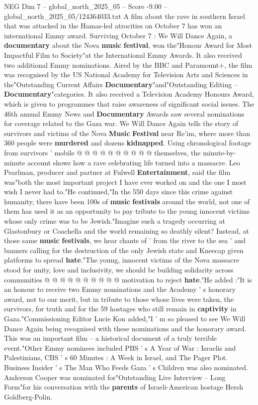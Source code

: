 \begin{textsample}{NEG Dim 7 – global\_north\_2025\_05 – Score -9.00 – global\_north\_2025\_05/124364033.txt}  \label{ex:f7_neg_103}
A film about the rave in southern Israel that was attacked in the Hamas-led atrocities on October 7 has won an international Emmy award.
Surviving October 7 : We Will Dance Again, a \textbf{documentary} about the Nova \textbf{music} \textbf{festival}, won the"Honour Award for Most Impactful Film to Society"at the International Emmy Awards.
It also received two additional Emmy nominations.
Aired by the BBC and Paramount+, the film was recognised by the US National Academy for Television Arts and Sciences in the"Outstanding Current Affairs \textbf{Documentary}"and"Outstanding Editing -- \textbf{Documentary}"categories.
It also received a Television Academy Honours Award, which is given to programmes that raise awareness of significant social issues.
The 46th annual Emmy News and \textbf{Documentary} Awards saw several nominations for coverage related to the Gaza war.
We Will Dance Again tells the story of survivors and victims of the Nova \textbf{Music} \textbf{Festival} near Re'im, where more than 360 people were \textbf{murdered} and dozens \textbf{kidnapped}.
Using chronological footage from survivors ' mobile @ @ @ @ @ @ @ @ @ @ themselves, the minute-by-minute account shows how a rave celebrating life turned into a massacre.
Leo Pearlman, producer and partner at Fulwell \textbf{Entertainment}, said the film was"both the most important project I have ever worked on and the one I most wish I never had to."He continued,"In the 550 days since this crime against humanity, there have been 100s of \textbf{music} \textbf{festivals} around the world, not one of them has used it as an opportunity to pay tribute to the young innocent victims whose only crime was to be Jewish."Imagine such a tragedy occurring at Glastonbury or Coachella and the world remaining so deathly silent?
Instead, at those same \textbf{music} \textbf{festivals}, we hear chants of ' from the river to the sea ' and banners calling for the destruction of the only Jewish state and Kneecap given platforms to spread \textbf{hate}."The young, innocent victims of the Nova massacre stood for unity, love and inclusivity, we should be building solidarity across communities @ @ @ @ @ @ @ @ @ @ motivation to reject \textbf{hate}."He added :"It is an honour to receive two Emmy nominations and the Academy ' s honorary award, not to our merit, but in tribute to those whose lives were taken, the survivors, for truth and for the 59 hostages who still remain in \textbf{captivity} in Gaza."Commissioning Editor Lucie Kon added,"I ' m so pleased to see We Will Dance Again being recognised with these nominations and the honorary award.
This was an important film -- a historical document of a truly terrible event."Other Emmy nominees included PBS ' s A Year of War : Israelis and Palestinians, CBS ' s 60 Minutes : A Week in Israel, and The Pager Plot.
Business Insider ' s The Man Who Feeds Gaza ' s Children was also nominated.
Anderson Cooper was nominated for"Outstanding Live Interview -- Long Form"for his conversation with the \textbf{parents} of Israeli-American hostage Hersh Goldberg-Polin.

\end{textsample}
